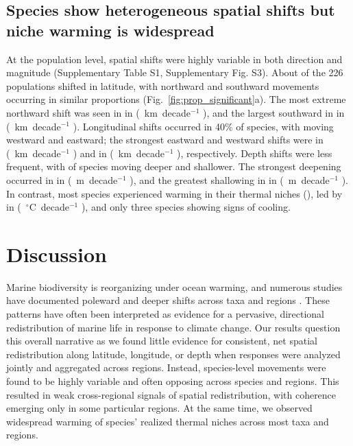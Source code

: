 \documentclass[9pt,twocolumn,twoside]{pnas-new}
\begin{document}
\subsection*{Species show heterogeneous spatial shifts but niche warming is widespread}





At the population level, spatial shifts were highly variable in both direction and magnitude (Supplementary Table S1, Supplementary Fig. S3). About \LatPerc{} of the 226 populations shifted in latitude, with northward and southward movements occurring in similar proportions (Fig.~\ref{fig:prop_significant}a). The most extreme northward shift was seen in \MaxLatSpecies{} in \MaxLatRegion{} (\MaxLatMedian{}~km~decade$^{-1}$ \MaxLatCI{}), and the largest southward in \MinLatSpecies{} in \MinLatRegion{} (\MinLatMedian{}~km~decade$^{-1}$ \MinLatCI{}). Longitudinal shifts occurred in 40\% of species, with \LonWestingPerc{} moving westward and \LonEastingPerc{} eastward; the strongest eastward and westward shifts were \MaxLonSpecies{} in \MaxLonRegion{} (\MaxLonMedian{}~km~decade$^{-1}$ \MaxLonCI{}) and \MinLonSpecies{} in \MinLonRegion{} (\MinLonMedian{}~km~decade$^{-1}$ \MinLonCI{}), respectively. Depth shifts were less frequent, with \DepthDeepeningPerc{} of species moving deeper and \DepthShallowingPerc{} shallower. The strongest deepening occurred in \MaxDepthSpecies{} in \MaxDepthRegion{} (\MaxDepthMedian{}~m~decade$^{-1}$ \MaxDepthCI{}), and the greatest shallowing in \MinDepthSpecies{} in \MinDepthRegion{} (\MinDepthMedian{}~m~decade$^{-1}$  \MinDepthCI{}). 
In contrast, most species experienced warming in their thermal niches (\ThermalPerc{}), led by \MaxThermalSpecies{} in \MaxThermalRegion{} (\MaxThermalMedian{}~$^\circ$C~decade$^{-1}$ \MaxThermalCI{}), and only three species showing signs of cooling.

\section*{Discussion}

Marine biodiversity is reorganizing under ocean warming, and numerous studies have documented poleward and deeper shifts across taxa and regions \citep{poloczanska_global_2013,dulvy_climate_2008,poloczanska_responses_2016, perry_climate_2005}. These patterns have often been interpreted as evidence for a pervasive, directional redistribution of marine life in response to climate change. Our results question this overall narrative as we found little evidence for consistent, net spatial redistribution along latitude, longitude, or depth when responses were analyzed jointly and aggregated across regions. Instead, species-level movements were found to be highly variable and often opposing across species and regions. This resulted in weak cross-regional signals of spatial redistribution, with coherence emerging only in some particular regions. At the same time, we observed widespread warming of species’ realized thermal niches across most taxa and regions.
\end{document}
